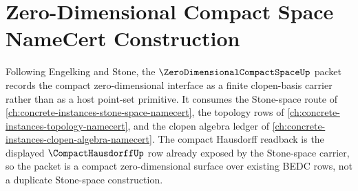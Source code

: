 \chapter{Zero-Dimensional Compact Space NameCert Construction}
\label{ch:concrete-instances-zero-dimensional-compact-space-namecert}

Following Engelking and Stone, the $\ZeroDimensionalCompactSpaceUp$ packet records the compact zero-dimensional interface as a finite clopen-basis carrier rather than as a host point-set primitive. It consumes the Stone-space route of \autoref{ch:concrete-instances-stone-space-namecert}, the topology rows of \autoref{ch:concrete-instances-topology-namecert}, and the clopen algebra ledger of \autoref{ch:concrete-instances-clopen-algebra-namecert}. The compact Hausdorff readback is the displayed $\CompactHausdorffUp$ row already exposed by the Stone-space carrier, so the packet is a compact zero-dimensional surface over existing BEDC rows, not a duplicate Stone-space construction.

